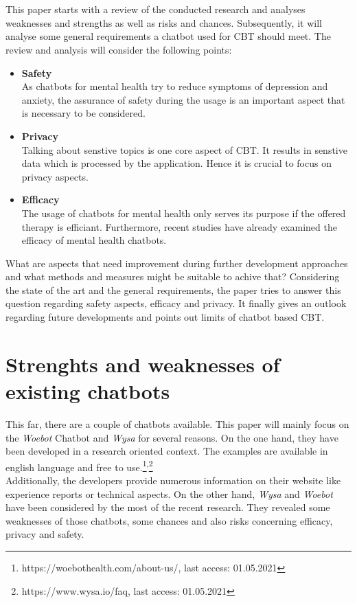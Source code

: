 \documentclass[sigconf, nonacm]{acmart}
\begin{document}
\\\\
This paper starts with a review of the conducted research and analyses weaknesses and strengths as well as risks and chances. 
Subsequently, it will analyse some general requirements a chatbot used for CBT should meet.
The review and analysis will consider the following points:
\\
\begin{itemize}
  \item{\textbf{Safety}}\\
  As chatbots for mental health try to reduce symptoms of depression and anxiety, the assurance of safety during the usage is an important aspect that is necessary to be considered.
  \\
  \item{\textbf{Privacy}}\\
  Talking about senstive topics is one core aspect of CBT. It results in senstive data which is processed by the application. Hence it is crucial to focus on privacy aspects.
  \\
  \item{\textbf{Efficacy}}\\
  The usage of chatbots for mental health only serves its purpose if the offered therapy is efficiant. Furthermore, recent studies have already examined the efficacy of mental health chatbots.\cite{Fitzpatrick2017,Inkster}
  \\
\end{itemize}
What are aspects that need improvement during further development approaches and what methods and measures might be suitable to achive that? 
Considering the state of the art and the general requirements, the paper tries to answer this question regarding safety aspects, efficacy and privacy.
It finally gives an outlook regarding future developments and points out limits of chatbot based CBT.


\section{Strenghts and weaknesses of existing chatbots}
\label{sec:two}
This far, there are a couple of chatbots available. This paper will mainly focus on the \emph{Woebot} Chatbot and \emph{Wysa} for several reasons.
On the one hand, they have been developed in a research oriented context. 
The examples are available in english language and free to use.\footnote{https://woebothealth.com/about-us/, last access: 01.05.2021}\textsuperscript{,}\footnote{https://www.wysa.io/faq, last access: 01.05.2021}
\\
Additionally, the developers provide numerous information on their website
like experience reports or technical aspects.
On the other hand, \emph{Wysa} and \emph{Woebot} have been considered by the most of the recent research.
They revealed some weaknesses of those chatbots, some chances and also risks concerning efficacy, privacy and safety.
\end{document}
